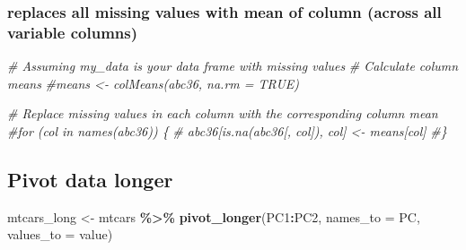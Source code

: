 \documentclass[
]{article}
\newenvironment{Shaded}{\begin{snugshade}}{\end{snugshade}}
\newcommand{\AttributeTok}[1]{\textcolor[rgb]{0.13,0.29,0.53}{#1}}
\newcommand{\CommentTok}[1]{\textcolor[rgb]{0.56,0.35,0.01}{\textit{#1}}}
\newcommand{\FunctionTok}[1]{\textcolor[rgb]{0.13,0.29,0.53}{\textbf{#1}}}
\newcommand{\NormalTok}[1]{#1}
\newcommand{\OtherTok}[1]{\textcolor[rgb]{0.56,0.35,0.01}{#1}}
\newcommand{\SpecialCharTok}[1]{\textcolor[rgb]{0.81,0.36,0.00}{\textbf{#1}}}
\newcommand{\StringTok}[1]{\textcolor[rgb]{0.31,0.60,0.02}{#1}}
\begin{document}
\begin{Shaded}
\end{Shaded}

\hypertarget{replaces-all-missing-values-with-mean-of-column-across-all-variable-columns}{%
\subsubsection{replaces all missing values with mean of column (across all variable columns)}\label{replaces-all-missing-values-with-mean-of-column-across-all-variable-columns}}

\begin{Shaded}
\begin{Highlighting}[]
\CommentTok{\# Assuming \textquotesingle{}my\_data\textquotesingle{} is your data frame with missing values}
\CommentTok{\# Calculate column means}
\CommentTok{\#means \textless{}{-} colMeans(abc36, na.rm = TRUE)}

\CommentTok{\# Replace missing values in each column with the corresponding column mean}
\CommentTok{\#for (col in names(abc36)) \{}
\CommentTok{\#  abc36[is.na(abc36[, col]), col] \textless{}{-} means[col]}
\CommentTok{\#\}}
\end{Highlighting}
\end{Shaded}

\hypertarget{pivot-data-longer}{%
\subsection{Pivot data longer}\label{pivot-data-longer}}

\begin{Shaded}
\begin{Highlighting}[]
\NormalTok{mtcars\_long }\OtherTok{\textless{}{-}}\NormalTok{ mtcars }\SpecialCharTok{\%\textgreater{}\%} \FunctionTok{pivot\_longer}\NormalTok{(PC1}\SpecialCharTok{:}\NormalTok{PC2, }\AttributeTok{names\_to =} \StringTok{\textquotesingle{}PC\textquotesingle{}}\NormalTok{, }\AttributeTok{values\_to =} \StringTok{\textquotesingle{}value\textquotesingle{}}\NormalTok{)}
\end{Highlighting}
\end{Shaded}
\end{document}
